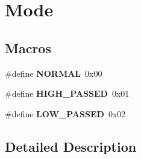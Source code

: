 \hypertarget{group___mode}{\section{Mode}
\label{group___mode}
}
\subsection*{Macros}
\begin{DoxyCompactItemize}
\item 
\hypertarget{group___mode_ga1291f416b069313021b519eea62d5bf1}{\#define {\bfseries N\-O\-R\-M\-A\-L}~0x00}\label{group___mode_ga1291f416b069313021b519eea62d5bf1}

\item 
\hypertarget{group___mode_ga816ed092a592f64b41097b7bcd1344f8}{\#define {\bfseries H\-I\-G\-H\-\_\-\-P\-A\-S\-S\-E\-D}~0x01}\label{group___mode_ga816ed092a592f64b41097b7bcd1344f8}

\item 
\hypertarget{group___mode_ga86e080a389eff01ba6b7852767b48357}{\#define {\bfseries L\-O\-W\-\_\-\-P\-A\-S\-S\-E\-D}~0x02}\label{group___mode_ga86e080a389eff01ba6b7852767b48357}

\end{DoxyCompactItemize}


\subsection{Detailed Description}
